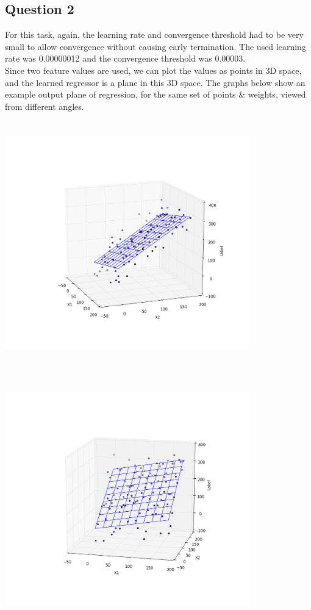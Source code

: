 \documentclass{article}
\begin{document}
\subsection*{Question 2}
For this task, again, the learning rate and convergence threshold had to be very small to allow convergence without causing early termination. The used learning rate was 0.00000012 and the convergence threshold was 0.00003. \\
\indent Since two feature values are used, we can plot the values as points in 3D space, and the learned regressor is a plane in this 3D space. The graphs below show an example output plane of regression, for the same set of points \& weights, viewed from different angles.

\begin{center}
\centerline{\includegraphics[width=400px, height=400px]{partB2_1}}
\vspace{2mm}
\centerline{\includegraphics[width=400px, height=400px]{partB2_2}}

\end{center}
\end{document}
